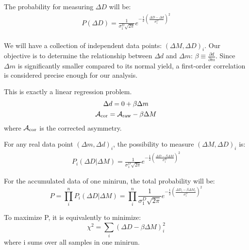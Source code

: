 The probability for measuring $\Delta D$ will be:
\begin{equation}
    \begin{gathered}
	P(\Delta D) = \frac{1}{\sigma_1^D\sqrt{2\pi}} e^{-\frac{1}{2}\left( \frac{\Delta D - \Delta d}{\sigma_1^D}\right)^2}    \\
    \end{gathered}
\end{equation}

We will have a collection of independent data points: $(\Delta M, \Delta D)_i$.
Our objective is to determine the relationship between $\Delta d$ and $\Delta m$: 
$\beta \equiv \frac{\partial d}{\partial m}$. Since $\Delta m$ is significantly
smaller compared to its normal yield, a first-order correlation is considered
precise enough for our analysis.

This is exactly a linear regression problem.
\begin{equation}
    \begin{gathered}
	\Delta d = 0 + \beta \Delta m	\\
	\mathcal{A}_{\text{cor}} = \mathcal{A}_{\text{raw}} - \beta\Delta M	\\
    \end{gathered}
    \label{eq:first_order_correlation}
\end{equation}
where $\mathcal{A}_{\text{cor}}$ is the corrected asymmetry.

For any real data point $(\Delta m, \Delta d)_i$, the possibility to measure
$(\Delta M, \Delta D)_i$ is:
\begin{equation}
    \begin{gathered}
	P_i(\Delta D|\Delta M) = \frac{1}{\sigma_1^D\sqrt{2\pi}} 
	    e^{-\frac{1}{2}\left( \frac{\Delta D - \beta\Delta M}{\sigma_1^D}\right)^2}
    \end{gathered}
\end{equation}

For the accumulated data of one minirun, the total probability will be:
\begin{equation}
    P = \prod_i^n P_i(\Delta D|\Delta M) = \prod_i^n \frac{1}{\sigma_1^D\sqrt{2\pi}} 
	    e^{-\frac{1}{2}\left( \frac{\Delta D_i - \beta\Delta M_i}{\sigma_1^D}\right)^2}
\end{equation}

To maximize P, it is equivalently to minimize:
\begin{equation}
    \chi^2 = \sum_i (\Delta D - \beta\Delta M)_i^2
    \label{eq:regression_chi2}
\end{equation}
where i sums over all samples in one minirun.

